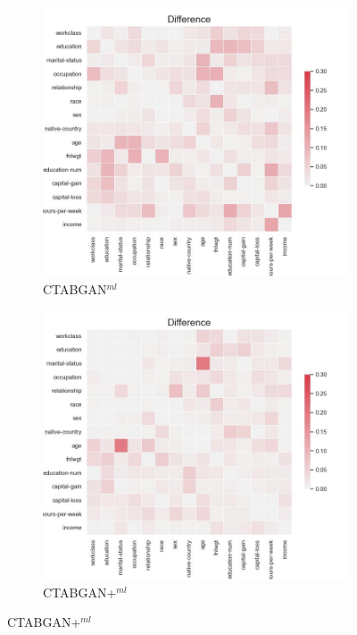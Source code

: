 \begin{figure}[h]
\begin{subfigure}{0.3\textwidth}
	\end{subfigure}
	\hfill
	\begin{subfigure}{0.3\textwidth}
		\includegraphics[width=\textwidth]{images/correlation_difference/ctabgan.jpg}
		\caption{CTABGAN$^{ml}$}
	\end{subfigure}

	\begin{subfigure}{0.3\textwidth}
		\includegraphics[width=\textwidth]{images/correlation_difference/ctabgan+.jpg}
		\caption{CTABGAN+$^{ml}$}


\end{subfigure}
\end{figure}
